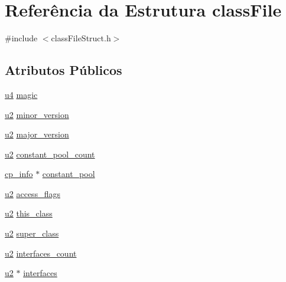 \hypertarget{structclassFile}{}\section{Referência da Estrutura class\+File}
\label{structclassFile}


{\ttfamily \#include $<$class\+File\+Struct.\+h$>$}

\subsection*{Atributos Públicos}
\begin{DoxyCompactItemize}
\item 
\hyperlink{lista__operandos_8h_ae5be1f726785414dd1b77d60df074c9d}{u4} \hyperlink{structclassFile_a3fec808625410854af3cb80b7faeca10}{magic}
\item 
\hyperlink{lista__operandos_8h_a732cde1300aafb73b0ea6c2558a7a54f}{u2} \hyperlink{structclassFile_aa7b4e7ee91468a9a2989dd9ec93c3ea0}{minor\+\_\+version}
\item 
\hyperlink{lista__operandos_8h_a732cde1300aafb73b0ea6c2558a7a54f}{u2} \hyperlink{structclassFile_a3765d2f6ef5f54e8e2c554afadb795f6}{major\+\_\+version}
\item 
\hyperlink{lista__operandos_8h_a732cde1300aafb73b0ea6c2558a7a54f}{u2} \hyperlink{structclassFile_ac8f5b297483f2b3e9f02ff133f248b40}{constant\+\_\+pool\+\_\+count}
\item 
\hyperlink{structcp__info}{cp\+\_\+info} $\ast$ \hyperlink{structclassFile_adb70ba83c3ffbcc26bffaff8185be813}{constant\+\_\+pool}
\item 
\hyperlink{lista__operandos_8h_a732cde1300aafb73b0ea6c2558a7a54f}{u2} \hyperlink{structclassFile_a78e101546396d4b3d24d89b084b4eadf}{access\+\_\+flags}
\item 
\hyperlink{lista__operandos_8h_a732cde1300aafb73b0ea6c2558a7a54f}{u2} \hyperlink{structclassFile_a152ce2f57b3fa175b95069452f9fa063}{this\+\_\+class}
\item 
\hyperlink{lista__operandos_8h_a732cde1300aafb73b0ea6c2558a7a54f}{u2} \hyperlink{structclassFile_a7d16e11061e4520ac93df39a5a65a215}{super\+\_\+class}
\item 
\hyperlink{lista__operandos_8h_a732cde1300aafb73b0ea6c2558a7a54f}{u2} \hyperlink{structclassFile_ab1ef5a76288d97e248fd48a46e93a185}{interfaces\+\_\+count}
\item 
\hyperlink{lista__operandos_8h_a732cde1300aafb73b0ea6c2558a7a54f}{u2} $\ast$ \hyperlink{structclassFile_a4b17bc5bb5475d1f7db40302ba9e1df1}{interfaces}

\end{DoxyCompactItemize}
